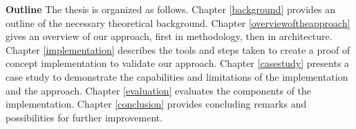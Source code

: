 \textbf{Outline} The thesis is organized as follows. Chapter \ref{background} provides an outline of the necessary theoretical background. Chapter \ref{overviewoftheapproach} gives an overview of our approach, first in methodology, then in architecture. Chapter \ref{implementation} describes the tools and steps taken to create a proof of concept implementation to validate our approach. Chapter \ref{casestudy} presents a case study to demonstrate the capabilities and limitations of the implementation and the approach. Chapter \ref{evaluation} evaluates the components of the implementation. Chapter \ref{conclusion} provides concluding remarks and possibilities for further improvement.





